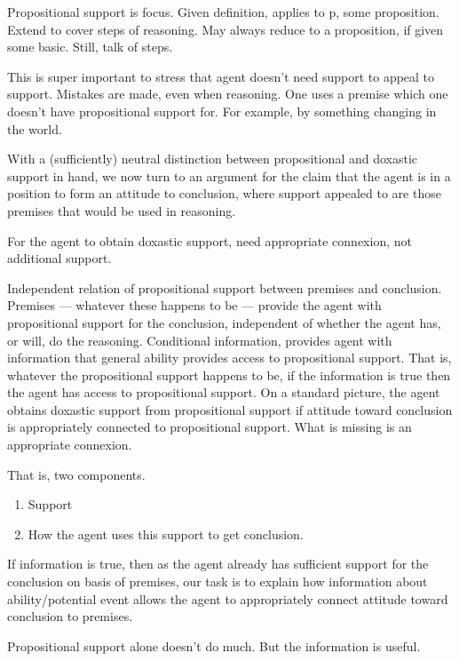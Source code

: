 \begin{note}
  Propositional support is focus.
  Given definition, applies to p, some proposition.
  Extend to cover steps of reasoning.
  May always reduce to a proposition, if given some basic.
  Still, talk of steps.
\end{note}

\begin{note}
  This is super important to stress that agent doesn't need support to appeal to support.
  Mistakes are made, even when reasoning.
  One uses a premise which one doesn't have propositional support for.
  For example, by something changing in the world.
\end{note}

\begin{note}
  With a (sufficiently) neutral distinction between propositional and doxastic support in hand, we now turn to an argument for the claim that the agent is in a position to form an attitude to conclusion, where support appealed to are those premises that would be used in reasoning.

  For the agent to obtain doxastic support, need appropriate connexion, not additional support.

  Independent relation of propositional support between premises and conclusion.
  Premises --- whatever these happens to be --- provide the agent with propositional support for the conclusion, independent of whether the agent has, or will, do the reasoning.
  Conditional information, provides agent with information that general ability provides access to propositional support.
  That is, whatever the propositional support happens to be, if the information is true then the agent has access to propositional support.
  On a standard picture, the agent obtains doxastic support from propositional support if attitude toward conclusion is appropriately connected to propositional support.
  What is missing is an appropriate connexion.

  That is, two components.
  \begin{enumerate}
  \item Support
  \item How the agent uses this support to get conclusion.
  \end{enumerate}

  If information is true, then as the agent already has sufficient support for the conclusion on basis of premises, our task is to explain how information about ability/potential event allows the agent to appropriately connect attitude toward conclusion to premises.

  Propositional support alone doesn't do much.
  But the information is useful.
\end{note}

